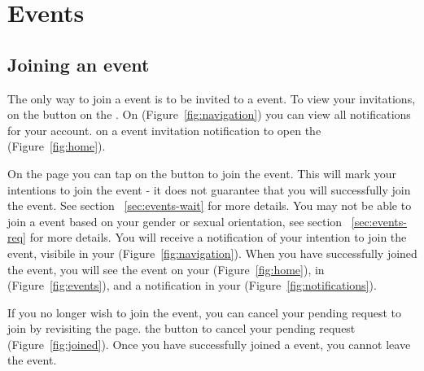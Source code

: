 \section{Events}
\label{sec:events}

\subsection{Joining an event}
\label{sec:events-join}
The only way to join a event is to be invited to a event.  To view your invitations,  on the  button on the \quicknav. On  (Figure~\ref{fig:navigation}) you can view all notifications for your account.   on a event invitation notification to open the  (Figure~\ref{fig:home}).  

On the  page you can tap on the  button to join the event. This will mark your intentions to join the event - it does not guarantee that you will successfully join the event. See section ~\ref{sec:events-wait} for more details.   You may not be able to join a event based on your gender or sexual orientation, see section ~\ref{sec:events-req} for more details. You will receive a notification of your intention to join the event, visibile in your  (Figure~\ref{fig:navigation}).   When you have successfully joined the event, you will see the event on your  (Figure~\ref{fig:home}), in  (Figure~\ref{fig:events}), and a notification in your  (Figure~\ref{fig:notifications}).  

If you no longer wish to join the event, you can cancel your pending request to join by revisiting the  page.   the  button to cancel your pending request (Figure~\ref{fig:joined}).  Once you have successfully joined a event, you cannot leave the event.

